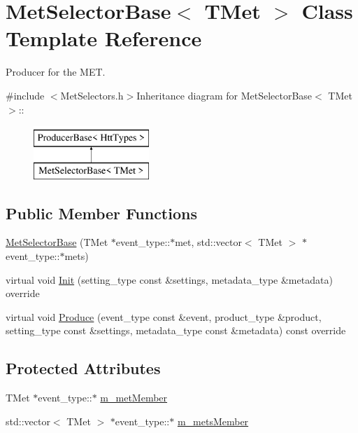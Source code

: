 \hypertarget{classMetSelectorBase}{
\section{MetSelectorBase$<$ TMet $>$ Class Template Reference}
\label{classMetSelectorBase}
}


Producer for the MET.  


{\ttfamily \#include $<$MetSelectors.h$>$}Inheritance diagram for MetSelectorBase$<$ TMet $>$::\begin{figure}[H]
\begin{center}
\leavevmode
\includegraphics[height=2cm]{classMetSelectorBase}
\end{center}
\end{figure}
\subsection*{Public Member Functions}
\begin{DoxyCompactItemize}
\item 
\hyperlink{classMetSelectorBase_a373ff1e127345c9c14a16e19c358d63b}{MetSelectorBase} (TMet $\ast$event\_\-type::$\ast$met, std::vector$<$ TMet $>$ $\ast$event\_\-type::$\ast$mets)
\item 
virtual void \hyperlink{classMetSelectorBase_a727ae5cae998adf7943885fd32417f68}{Init} (setting\_\-type const \&settings, metadata\_\-type \&metadata) override
\item 
virtual void \hyperlink{classMetSelectorBase_a61da28f5d705a0e0a620879c7bf6a61c}{Produce} (event\_\-type const \&event, product\_\-type \&product, setting\_\-type const \&settings, metadata\_\-type const \&metadata) const override
\end{DoxyCompactItemize}
\subsection*{Protected Attributes}
\begin{DoxyCompactItemize}
\item 
TMet $\ast$event\_\-type::$\ast$ \hyperlink{classMetSelectorBase_a2eaea4fc8ec9c76234347ada082c5f9d}{m\_\-metMember}
\item 
std::vector$<$ TMet $>$ $\ast$event\_\-type::$\ast$ \hyperlink{classMetSelectorBase_a035fd3acacfd2f9a20f110d2134aa85f}{m\_\-metsMember}
\end{DoxyCompactItemize}


